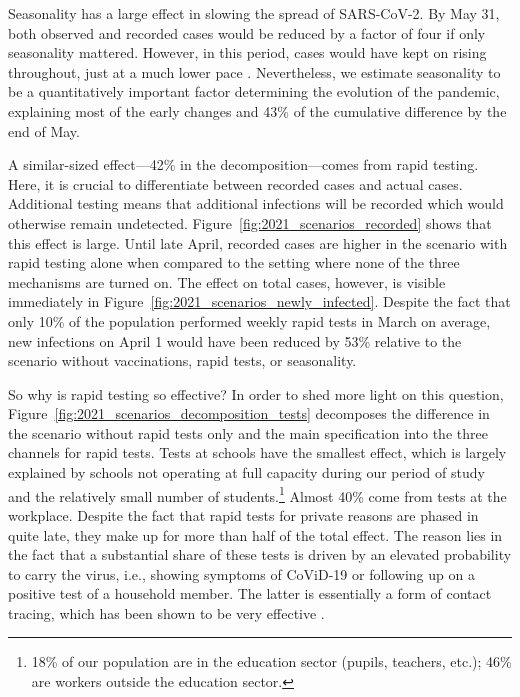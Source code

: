 Seasonality has a large effect in slowing the spread of SARS-CoV-2. By May 31, both
observed and recorded cases would be reduced by a factor of four if only seasonality
mattered. However, in this period, cases would have kept on rising throughout, just at a
much lower pace \citep[this is in line with results in][, which our seasonality measure
is based on]{Gavenciak2021}. Nevertheless, we estimate seasonality to be a
quantitatively important factor determining the evolution of the pandemic, explaining
most of the early changes and 43\% of the cumulative difference by the end of May.

A similar-sized effect---42\% in the decomposition---comes from rapid testing. Here, it
is crucial to differentiate between recorded cases and actual cases. Additional testing
means that additional infections will be recorded which would otherwise remain
undetected. Figure~\ref{fig:2021_scenarios_recorded} shows that this effect is large.
Until late April, recorded cases are higher in the scenario with rapid testing alone when
compared to the setting where none of the three mechanisms are turned on. The effect on
total cases, however, is visible immediately in
Figure~\ref{fig:2021_scenarios_newly_infected}. Despite the fact that only 10\% of the
population performed weekly rapid tests in March on average, new infections on April 1
would have been reduced by 53\% relative to the scenario without vaccinations, rapid
tests, or seasonality.

So why is rapid testing so effective? In order to shed more light on this question,
Figure~\ref{fig:2021_scenarios_decomposition_tests} decomposes the difference in the
scenario without rapid tests only and the main specification into the three channels for
rapid tests. Tests at schools have the smallest effect, which is largely explained by
schools not operating at full capacity during our period of study and the relatively
small number of students.\footnote{18\% of our population are in the education sector
(pupils, teachers, etc.); 46\% are workers outside the education sector.} Almost 40\%
come from tests at the workplace. Despite the fact that rapid tests for private reasons
are phased in quite late, they make up for more than half of the total effect. The reason
lies in the fact that a substantial share of these tests is driven by an elevated
probability to carry the virus, i.e., showing symptoms of CoViD-19 or following up on a
positive test of a household member. The latter is essentially a form of contact tracing,
which has been shown to be very effective \citep{Contreras2021,
Kretzschmar2020,Fetzer2020}.

